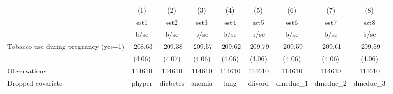 {
\def\sym#1{\ifmmode^{#1}\else\(^{#1}\)\fi}
\begin{tabular}{l*{8}{c}}
\hline\hline
                                                  &\multicolumn{1}{c}{(1)}&\multicolumn{1}{c}{(2)}&\multicolumn{1}{c}{(3)}&\multicolumn{1}{c}{(4)}&\multicolumn{1}{c}{(5)}&\multicolumn{1}{c}{(6)}&\multicolumn{1}{c}{(7)}&\multicolumn{1}{c}{(8)}\\
                                                  &        est1&        est2&        est3&        est4&        est5&        est6&        est7&        est8\\
                                                  &        b/se&        b/se&        b/se&        b/se&        b/se&        b/se&        b/se&        b/se\\
\hline
Tobacco use during pregnancy (yes=1)              &     -208.63&     -209.38&     -209.57&     -209.62&     -209.79&     -209.59&     -209.61&     -209.59\\
                                                  &      (4.06)&      (4.07)&      (4.06)&      (4.06)&      (4.06)&      (4.06)&      (4.06)&      (4.06)\\
\hline
Observations                                      &      114610&      114610&      114610&      114610&      114610&      114610&      114610&      114610\\
Dropped covariate                                 &      phyper&    diabetes&      anemia&        lung&     dlivord&    dmeduc\_1&    dmeduc\_2&    dmeduc\_3\\
\hline\hline
\end{tabular}
}
